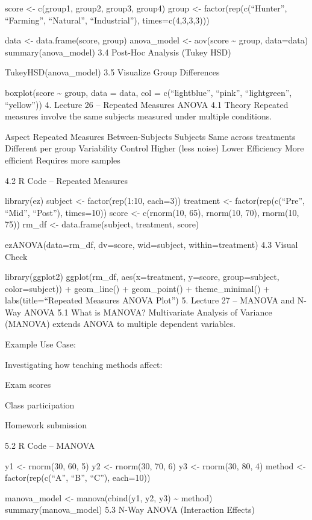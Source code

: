 \documentclass[
  letterpaper,
  DIV=11,
  numbers=noendperiod]{scrreprt}
\begin{document}
score \textless- c(group1, group2, group3, group4) group \textless-
factor(rep(c(``Hunter'', ``Farming'', ``Natural'', ``Industrial''),
times=c(4,3,3,3)))

data \textless- data.frame(score, group) anova\_model \textless-
aov(score \textasciitilde{} group, data=data) summary(anova\_model) 3.4
Post-Hoc Analysis (Tukey HSD)

TukeyHSD(anova\_model) 3.5 Visualize Group Differences

boxplot(score \textasciitilde{} group, data = data, col =
c(``lightblue'', ``pink'', ``lightgreen'', ``yellow'')) 4. Lecture 26 --
Repeated Measures ANOVA 4.1 Theory Repeated measures involve the same
subjects measured under multiple conditions.

Aspect Repeated Measures Between-Subjects Subjects Same across
treatments Different per group Variability Control Higher (less noise)
Lower Efficiency More efficient Requires more samples

4.2 R Code -- Repeated Measures

library(ez) subject \textless- factor(rep(1:10, each=3)) treatment
\textless- factor(rep(c(``Pre'', ``Mid'', ``Post''), times=10)) score
\textless- c(rnorm(10, 65), rnorm(10, 70), rnorm(10, 75)) rm\_df
\textless- data.frame(subject, treatment, score)

ezANOVA(data=rm\_df, dv=score, wid=subject, within=treatment) 4.3 Visual
Check

library(ggplot2) ggplot(rm\_df, aes(x=treatment, y=score, group=subject,
color=subject)) + geom\_line() + geom\_point() + theme\_minimal() +
labs(title=``Repeated Measures ANOVA Plot'') 5. Lecture 27 -- MANOVA and
N-Way ANOVA 5.1 What is MANOVA? Multivariate Analysis of Variance
(MANOVA) extends ANOVA to multiple dependent variables.

Example Use Case:

Investigating how teaching methods affect:

Exam scores

Class participation

Homework submission

5.2 R Code -- MANOVA

y1 \textless- rnorm(30, 60, 5) y2 \textless- rnorm(30, 70, 6) y3
\textless- rnorm(30, 80, 4) method \textless- factor(rep(c(``A'', ``B'',
``C''), each=10))

manova\_model \textless- manova(cbind(y1, y2, y3) \textasciitilde{}
method) summary(manova\_model) 5.3 N-Way ANOVA (Interaction Effects)
\end{document}
